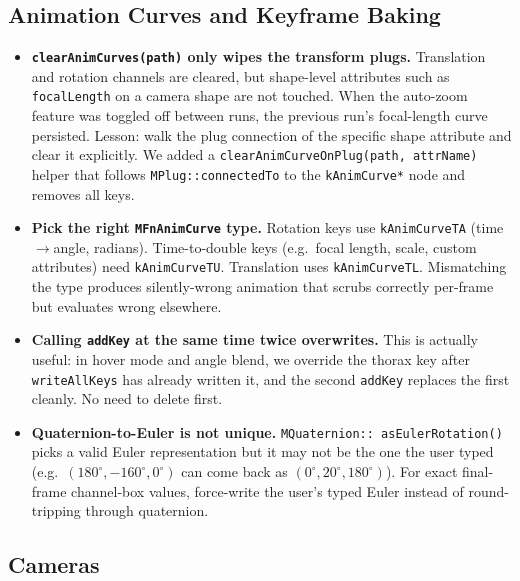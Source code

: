 \documentclass[12pt]{article}
\begin{document}
\subsection*{Animation Curves and Keyframe Baking}

\begin{itemize}
  \item \textbf{\texttt{clearAnimCurves(path)} only wipes the transform
    plugs.}  Translation and rotation channels are cleared, but shape-level
    attributes such as \texttt{focalLength} on a camera shape are not
    touched.  When the auto-zoom feature was toggled off between runs, the
    previous run's focal-length curve persisted.  Lesson: walk the plug
    connection of the specific shape attribute and clear it explicitly.
    We added a \texttt{clearAnimCurveOnPlug(path, attrName)} helper that
    follows \texttt{MPlug::connectedTo} to the \texttt{kAnimCurve*} node
    and removes all keys.

  \item \textbf{Pick the right \texttt{MFnAnimCurve} type.}  Rotation keys
    use \texttt{kAnimCurveTA} (time$\to$angle, radians).  Time-to-double
    keys (e.g.\ focal length, scale, custom attributes) need
    \texttt{kAnimCurveTU}.  Translation uses \texttt{kAnimCurveTL}.
    Mismatching the type produces silently-wrong animation that scrubs
    correctly per-frame but evaluates wrong elsewhere.

  \item \textbf{Calling \texttt{addKey} at the same time twice overwrites.}
    This is actually useful: in hover mode and angle blend, we override the
    thorax key after \texttt{writeAllKeys} has already written it, and the
    second \texttt{addKey} replaces the first cleanly.  No need to delete
    first.

  \item \textbf{Quaternion-to-Euler is not unique.}  \texttt{MQuaternion::
    asEulerRotation()} picks a valid Euler representation but it may not
    be the one the user typed (e.g.\ $(180^\circ, -160^\circ, 0^\circ)$
    can come back as $(0^\circ, 20^\circ, 180^\circ)$).  For exact
    final-frame channel-box values, force-write the user's typed Euler
    instead of round-tripping through quaternion.
\end{itemize}

\subsection*{Cameras}
\end{document}

